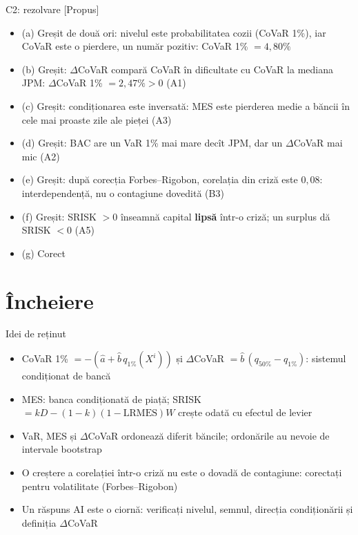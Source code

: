 \ifsolutions
\begin{frame}{C2: rezolvare [Propus]}
\itemsize{\footnotesize}
\begin{itemize}
    \item (a) Greșit de două ori: nivelul este probabilitatea cozii (CoVaR 1\%), iar CoVaR este o pierdere, un număr pozitiv: CoVaR 1\% $= 4{,}80\%$
    \item (b) Greșit: $\Delta$CoVaR compară CoVaR în dificultate cu CoVaR la mediana JPM: $\Delta$CoVaR 1\% $= 2{,}47\% > 0$ (A1)
    \item (c) Greșit: condiționarea este inversată: MES este pierderea medie a băncii în cele mai proaste zile ale pieței (A3)
    \item (d) Greșit: BAC are un VaR 1\% mai mare decît JPM, dar un $\Delta$CoVaR mai mic (A2)
    \item (e) Greșit: după corecția Forbes--Rigobon, corelația din criză este $0{,}08$: interdependență, nu o contagiune dovedită (B3)
    \item (f) Greșit: SRISK $> 0$ înseamnă capital \textbf{lipsă} într-o criză; un surplus dă SRISK $< 0$ (A5)
    \item (g) Corect
\end{itemize}
\end{frame}
\fi


\section{Încheiere}

\begin{frame}{Idei de reținut}
\itemsize{\small}
\begin{itemize}
    \item CoVaR 1\% $= -(\hat a + \hat b\,q_{1\%}(X^i))$ și $\Delta$CoVaR $= \hat b\,(q_{50\%} - q_{1\%})$: sistemul condiționat de bancă
    \item MES: banca condiționată de piață; SRISK $= kD - (1 - k)(1 - \mathrm{LRMES})W$ crește odată cu efectul de levier
    \item VaR, MES și $\Delta$CoVaR ordonează diferit băncile; ordonările au nevoie de intervale bootstrap
    \item O creștere a corelației într-o criză nu este o dovadă de contagiune: corectați pentru volatilitate (Forbes--Rigobon)
    \item Un răspuns AI este o ciornă: verificați nivelul, semnul, direcția condiționării și definiția $\Delta$CoVaR
\end{itemize}
\end{frame}

